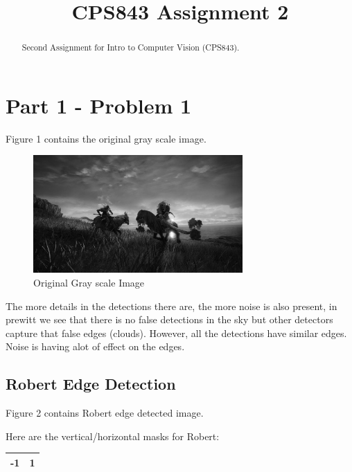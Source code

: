 \documentclass[conference]{IEEEtran}
\begin{document}
\title{CPS843 Assignment 2}

\author{
}

\maketitle

\begin{abstract}

Second Assignment for Intro to Computer Vision (CPS843).

\end{abstract}



\section*{Part 1 - Problem 1}

Figure 1 contains the original gray scale image.

\begin{figure}[htbp]
    \centering
    \includegraphics[width=8cm, height=4.5cm]{images/eldenring_grayscale.jpg}
    \caption{Original Gray scale Image}
\end{figure}

The more details in the detections there are, the more noise is also present, in prewitt we see that there is no false detections in the sky but other detectors capture that false edges (clouds). However, all the detections have similar edges. Noise is having alot of effect on the edges.

\subsection{Robert Edge Detection}

Figure 2 contains Robert edge detected image.

Here are the vertical/horizontal masks for Robert:

\begin{center}
\begin{tabular}{ |c|c| } 
\hline
-1 & 1 \\ \hline
\end{tabular}
\end{center}
\end{document}
